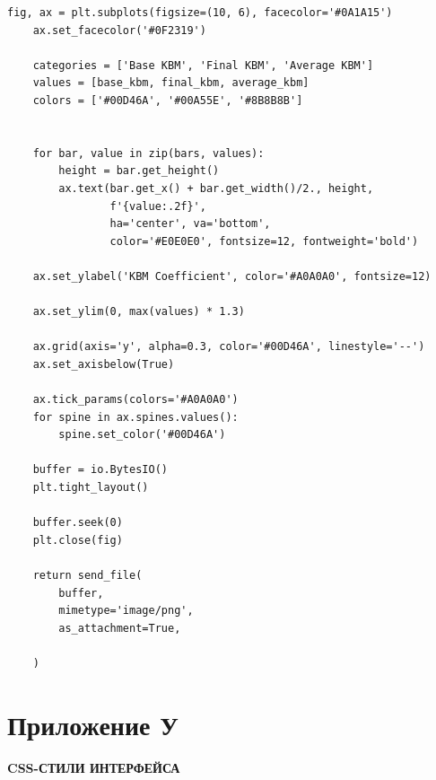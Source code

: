 \begin{lstlisting}[caption={Экспорт в PDF, CSV и PNG}, label={lst:export}    
    breakatwhitespace=true,
    breakindent=10pt,
    columns=fullflexible
]
    fig, ax = plt.subplots(figsize=(10, 6), facecolor='#0A1A15')
    ax.set_facecolor('#0F2319')
    
    categories = ['Base KBM', 'Final KBM', 'Average KBM']
    values = [base_kbm, final_kbm, average_kbm]
    colors = ['#00D46A', '#00A55E', '#8B8B8B']

    
    for bar, value in zip(bars, values):
        height = bar.get_height()
        ax.text(bar.get_x() + bar.get_width()/2., height,
                f'{value:.2f}',
                ha='center', va='bottom', 
                color='#E0E0E0', fontsize=12, fontweight='bold')
    
    ax.set_ylabel('KBM Coefficient', color='#A0A0A0', fontsize=12)

    ax.set_ylim(0, max(values) * 1.3)
    
    ax.grid(axis='y', alpha=0.3, color='#00D46A', linestyle='--')
    ax.set_axisbelow(True)
    
    ax.tick_params(colors='#A0A0A0')
    for spine in ax.spines.values():
        spine.set_color('#00D46A')
    
    buffer = io.BytesIO()
    plt.tight_layout()

    buffer.seek(0)
    plt.close(fig)
    
    return send_file(
        buffer,
        mimetype='image/png',
        as_attachment=True,

    )

\end{lstlisting}

\newpage
\section*{Приложение У}
\label{app:ui_styles}
\begin{center}
\textbf{CSS-СТИЛИ ИНТЕРФЕЙСА}
\end{center}

\vspace{1cm}

